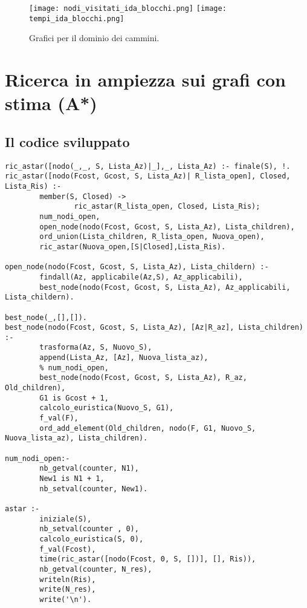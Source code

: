 \begin{landscape}
\begin{sidewaysfigure}
\centering
{\texttt{[image: nodi\_visitati\_ida\_blocchi.png]}}\qquad\qquad
{\texttt{[image: tempi\_ida\_blocchi.png]}}\qquad\qquad
\caption{Grafici per il dominio dei cammini.}
\end{sidewaysfigure}
\end{landscape}

\newpage
\section{Ricerca in ampiezza sui grafi con stima (A*)}

\subsection{Il codice sviluppato}

\begin{lstlisting}
ric_astar([nodo(_,_, S, Lista_Az)|_],_, Lista_Az) :- finale(S), !.
ric_astar([nodo(Fcost, Gcost, S, Lista_Az)| R_lista_open], Closed, Lista_Ris) :-
        member(S, Closed) ->
                ric_astar(R_lista_open, Closed, Lista_Ris);
        num_nodi_open,
        open_node(nodo(Fcost, Gcost, S, Lista_Az), Lista_children),
        ord_union(Lista_children, R_lista_open, Nuova_open),
        ric_astar(Nuova_open,[S|Closed],Lista_Ris).

open_node(nodo(Fcost, Gcost, S, Lista_Az), Lista_childern) :-
        findall(Az, applicabile(Az,S), Az_applicabili),
        best_node(nodo(Fcost, Gcost, S, Lista_Az), Az_applicabili, Lista_childern).

best_node(_,[],[]).
best_node(nodo(Fcost, Gcost, S, Lista_Az), [Az|R_az], Lista_children) :-
        trasforma(Az, S, Nuovo_S),
        append(Lista_Az, [Az], Nuova_lista_az),
        % num_nodi_open,
        best_node(nodo(Fcost, Gcost, S, Lista_Az), R_az, Old_children),
        G1 is Gcost + 1,
        calcolo_euristica(Nuovo_S, G1),
        f_val(F),
        ord_add_element(Old_children, nodo(F, G1, Nuovo_S, Nuova_lista_az), Lista_children).

num_nodi_open:-
        nb_getval(counter, N1),
        New1 is N1 + 1,
        nb_setval(counter, New1).

astar :-
        iniziale(S),
        nb_setval(counter , 0),
        calcolo_euristica(S, 0),
        f_val(Fcost),
        time(ric_astar([nodo(Fcost, 0, S, [])], [], Ris)),
        nb_getval(counter, N_res),
        writeln(Ris),
        write(N_res),
        write('\n').
\end{lstlisting}

